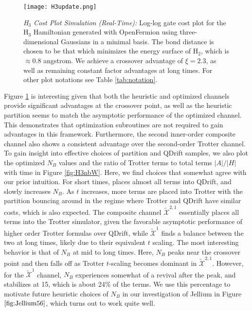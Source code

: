 \begin{figure}[htbp!]
    \centering
    \texttt{[image: H3update.png]}
    \caption{\textit{H$_3$ Cost Plot Simulation (Real-Time): }Log-log gate cost plot for the {\rm H$_3$} Hamiltonian generated with OpenFermion using three-dimensional Gaussians in a minimal basis. The bond distance is chosen to be that which minimizes the energy surface of {\rm H$_2$}, which is $\approx 0.8$ angstrom. We achieve a crossover advantage of $\xi = 2.3$, as well as remaining constant factor advantages at long times. For other plot notations see Table \ref{tab:notation}.} \label{fig:H3}
\end{figure} 
\FloatBarrier

Figure \ref{fig:H3} is interesting given that both the heuristic and optimized channels provide significant advantages at the crossover point, as well as the heuristic partition seems to match the asymptotic performance of the optimized channel. This demonstrates that optimization subroutines are not required to gain advantages in this framework. Furthermore, the second inner-order composite channel also shows a consistent advantage over the second-order Trotter channel. \\

To gain insight into effective choices of partition and QDrift samples, we also plot the optimized $N_B$ values and the ratio of Trotter terms to total terms $|A|/|H|$ with time in Figure \ref{fig:H3nbW}. Here, we find choices that somewhat agree with our prior intuition. For short times, places almost all terms into QDrift, and slowly increases $N_B$. As $t$ increases, more terms are placed into Trotter with the partition bouncing around in the regime where Trotter and QDrift have similar costs, which is also expected. The composite channel $\widetilde{\mathcal{X}}^{2,1}$  essentially places all terms into the Trotter simulator, given the favorable asymptotic performance of higher order Trotter formulas over QDrift, while $\widetilde{\mathcal{X}}^{1}$ finds a balance between the two at long times, likely due to their equivalent $t$ scaling. The most interesting behavior is that of $N_B$ at mid to long times. Here, $N_B$ peaks near the crossover point and then falls off as Trotter $t$-scaling becomes dominant in $\widetilde{\mathcal{X}}^{2,1}$. However, for the $\widetilde{\mathcal{X}}^{1}$ channel, $N_B$ experiences somewhat of a revival after the peak, and stabilizes at 15, which is about 24\% of the terms. We use this percentage to motivate future heuristic choices of $N_B$ in our investigation of Jellium in Figure $\ref{fig:Jellium56}$, which turns out to work quite well. 

